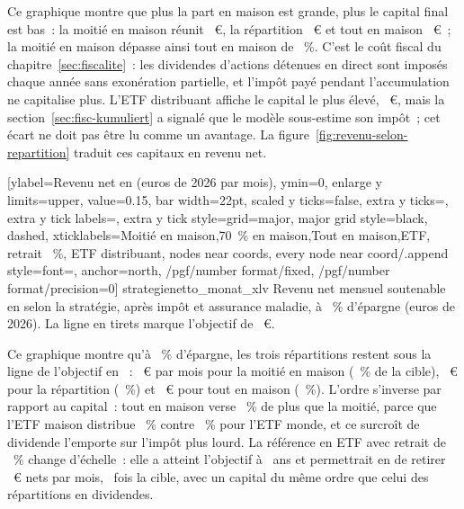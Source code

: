 Ce graphique montre que plus la part en maison est grande, plus le capital final est bas~: la
moiti\'e en maison r\'eunit \KapitalAufteilungMaisonFuenfzig~€, la r\'epartition \ReferenzStrategie{}
\KapitalHorizonZwanzig~€ et tout en maison \KapitalAufteilungMaisonHundert~€~; la moiti\'e en maison
d\'epasse ainsi tout en maison de \KapitalAufteilungEcartProzent~\%. C'est le co\^ut fiscal du
chapitre~\ref{sec:fiscalite}~: les dividendes d'actions d\'etenues en direct sont impos\'es chaque
ann\'ee sans exon\'eration partielle, et l'imp\^ot pay\'e pendant l'accumulation ne capitalise plus.
L'ETF distribuant affiche le capital le plus \'elev\'e, \KapitalAufteilungEtfUmschichtung~€, mais la
section~\ref{sec:fisc-kumuliert} a signal\'e que le mod\`ele sous-estime son imp\^ot~; cet \'ecart ne
doit pas \^etre lu comme un avantage. La figure~\ref{fig:revenu-selon-repartition} traduit ces
capitaux en revenu net.

[ylabel={Revenu net en \AnneeHorizonFin{} (euros de 2026 par mois)},
  ymin=0, enlarge y limits={upper, value=0.15}, bar width=22pt, scaled y ticks=false,
  extra y ticks={\ZielMonatNombre}, extra y tick labels={},
  extra y tick style={grid=major, major grid style={black, dashed}},
  xticklabels={{Moiti\'e en maison},{70~\% en maison},{Tout en maison},{ETF, retrait \TauxRetrait~\%},
    {ETF distribuant}},
  nodes near coords, every node near coord/.append style={font=\scriptsize, anchor=north,
    /pgf/number format/fixed, /pgf/number format/precision=0}]%
  {strategie}{netto_monat_xlv}%
  {Revenu net mensuel soutenable en \AnneeHorizonFin{} selon la strat\'egie, apr\`es imp\^ot et
  assurance maladie, \`a \SparquoteZwanzig~\% d'\'epargne (euros de 2026). La ligne en tirets marque
  l'objectif de \ZielMonat~€.\label{fig:revenu-selon-repartition}}

Ce graphique montre qu'\`a \SparquoteZwanzig~\% d'\'epargne, les trois r\'epartitions restent sous la
ligne de l'objectif en \AnneeHorizonFin~: \RevenuAufteilungMaisonFuenfzig~€ par mois pour la moiti\'e
en maison (\RevenuAufteilungMaisonFuenfzigPartCible~\% de la cible), \RevenuHorizonZwanzig~€ pour la
r\'epartition \ReferenzStrategie{} (\RevenuHorizonZwanzigPartCible~\%) et \RevenuAufteilungMaisonHundert~€
pour tout en maison (\RevenuAufteilungMaisonHundertPartCible~\%). L'ordre s'inverse par rapport au
capital~: tout en maison verse \RevenuAufteilungEcartProzent~\% de plus que la moiti\'e, parce que
l'ETF maison distribue \RenditeDivMaison~\% contre \RenditeDivEtf~\% pour l'ETF monde, et ce surcro\^it
de dividende l'emporte sur l'imp\^ot plus lourd. La r\'ef\'erence en ETF avec retrait de
\TauxRetrait~\% change d'\'echelle~: elle a atteint l'objectif \`a \AlterEtfReferenzZwanzig~ans et
permettrait en \AnneeHorizonFin{} de retirer \RevenuAufteilungEtfReferenz~€ nets par mois,
\RevenuAufteilungEtfReferenzMultiple~fois la cible, avec un capital du m\^eme ordre que celui des
r\'epartitions en dividendes. 

